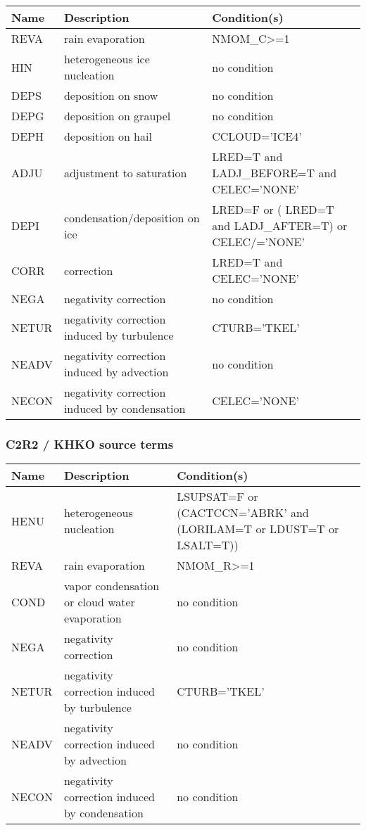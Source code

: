 \begin{longtable} {|p{}|p{}|p{}|}
\hline
Name & Description & Condition(s) \\
\hline \hline
\endhead
REVA   & rain evaporation                              & NMOM\_C>=1 \\\hline
HIN    & heterogeneous ice nucleation                  & no condition \\\hline
DEPS   & deposition on snow                            & no condition \\\hline
DEPG   & deposition on graupel                         & no condition \\\hline
DEPH   & deposition on hail                            & CCLOUD='ICE4' \\\hline
ADJU   & adjustment to saturation                      & LRED=T and LADJ\_BEFORE=T and CELEC='NONE' \\\hline
DEPI   & condensation/deposition on ice                & LRED=F or ( LRED=T and LADJ\_AFTER=T) or CELEC/='NONE' \\\hline
CORR   & correction                                    & LRED=T and CELEC='NONE' \\\hline
NEGA   & negativity correction                         & no condition \\\hline
NETUR  & negativity correction induced by turbulence   & CTURB='TKEL' \\\hline
NEADV  & negativity correction induced by advection    & no condition \\\hline
NECON  & negativity correction induced by condensation & CELEC='NONE' \\\hline
\end{longtable}

\subsubsection{C2R2 / KHKO source terms}

\begin{longtable} {|p{}|p{}|p{}|}
\hline
Name & Description & Condition(s) \\
\hline \hline
\endhead
HENU   & heterogeneous nucleation                      & LSUPSAT=F or (CACTCCN='ABRK' and (LORILAM=T or LDUST=T or LSALT=T)) \\\hline
REVA   & rain evaporation                              & NMOM\_R>=1 \\\hline
COND   & vapor condensation or cloud water evaporation & no condition \\\hline
NEGA   & negativity correction                         & no condition \\\hline
NETUR  & negativity correction induced by turbulence   & CTURB='TKEL' \\\hline
NEADV  & negativity correction induced by advection    & no condition \\\hline
NECON  & negativity correction induced by condensation & no condition \\\hline
\end{longtable}


